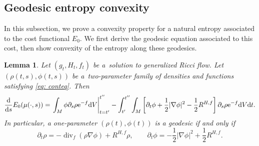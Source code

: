 \documentclass[pdftex]{sigma}
\numberwithin{equation}{section}
\newtheorem{Lemma}[thm]{Lemma}
\newcommand{\del}{\partial}
\newcommand{\N}{\nabla}
\DeclareMathOperator{\divg}{div}
\begin{document}
\subsection{Geodesic entropy convexity}

In this subsection, we prove a convexity property for a natural entropy associated to the cost functional $E_0$. We first derive the geodesic equation associated to this cost, then show convexity of the entropy along these geodesics.

\begin{Lemma}\label{lemma: el} Let $(g_t,H_t, f_t)$ be a~solution to generalized Ricci flow. Let
$(\rho(t,s), \phi(t,s))$ be a~two-parameter family of densities and functions satisfying \eqref{eq: conteq}. Then
	\begin{align*}
	\frac{{\rm d}}{{\rm d}s}E_0(\mu(\cdot,s))=\left.\int_M\phi\partial_s\rho {\rm e}^{-f} {\rm d}V\right|_{t=t'}^{t''}
	-\int_{t'}^{t''}\int_M\left[\partial_t\phi+\frac12|\nabla\phi|^2 -\frac12 R^{H,f}\right] \partial_s\rho {\rm e}^{-f} {\rm d}V{\rm d}t.
	\end{align*}
 In particular, a one-parameter $(\rho(t), \phi(t))$ is a geodesic if and only if
\begin{equation}\label{eq: geodesic}
\del_t \rho=-\divg_f(\rho\N\phi)+R^{H,f}\rho,\qquad
\del_t\phi=-\frac12|\N\phi|^2+\frac12 R^{H,f}.
\end{equation}
\end{Lemma}
\end{document}
